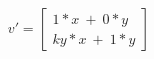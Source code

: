 \documentclass[preview]{standalone}
\begin{document}
\begin{align*}
v'=\begin{bmatrix}
                        1*x\ +\ 0*y\\
                        ky*x\ +\ 1*y
                        \end{bmatrix}\\
\end{align*}
\end{document}
